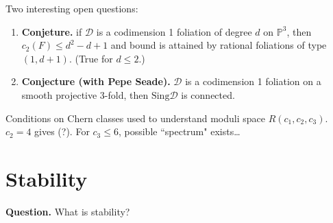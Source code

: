 Two interesting open questions:
\begin{enumerate}
\item {\bf Conjeture.} if $\mathcal{D}$ is a codimension 1 foliation of degree
$d$ on $\mathbb{P}^3$, then $c_2(F)\leq d^2-d+1$ and bound is attained
by rational foliations of type $(1,d+1)$. (True for $d \leq 2$.)
\item {\bf Conjecture (with Pepe Seade).} $\mathcal{D}$ is a codimension 1 
foliation on a smooth projective 3-fold, then $\text{Sing}\mathcal{D}$ is connected.
\end{enumerate}

\begin{theorem}
\label{theorem-jardim-muniz}
Conditions on Chern classes used to understand moduli space $R(c_1,c_2,c_3)$.
$c_2=4$ gives (?). For $c_3\leq 6$, possible ``spectrum" exists…
\end{theorem}

\section{Stability}
\label{section-stability}

{\bf Question.} What is stability?

